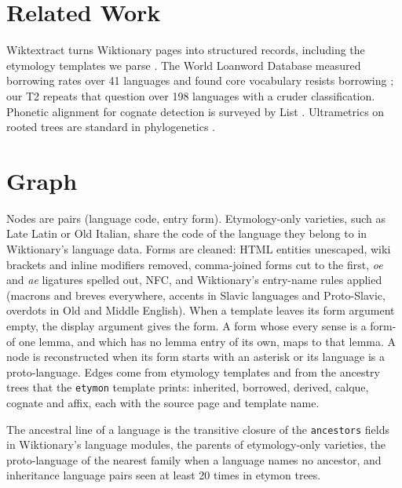 \documentclass[11pt]{article}
\begin{document}
\section{Related Work}
\label{sec:related}

Wiktextract turns Wiktionary pages into structured records, including the
etymology templates we parse \autocite{ylonen2022wiktextract,kaikki2026raw}.
The World Loanword Database measured borrowing rates over 41 languages and
found core vocabulary resists borrowing \autocite{haspelmath2009loanwords};
our T2 repeats that question over 198 languages with a cruder
classification. Phonetic alignment for cognate detection is surveyed by
List \autocite{list2014sequence}. Ultrametrics on rooted trees are
standard in phylogenetics \autocite{semple2003phylogenetics}.

\section{Graph}
\label{sec:graph}

\begin{definition}
\label{def:graph}
Nodes are pairs (language code, entry form). Etymology-only varieties,
such as Late Latin or Old Italian, share the code of the language they
belong to in Wiktionary's language data. Forms are cleaned: HTML entities
unescaped, wiki brackets and inline modifiers removed, comma-joined forms
cut to the first, \emph{oe} and \emph{ae} ligatures spelled out, NFC, and
Wiktionary's entry-name rules applied (macrons and breves everywhere,
accents in Slavic languages and Proto-Slavic, overdots in Old and Middle
English). When a template leaves its form argument empty, the display
argument gives the form. A form whose every sense is a form-of one lemma,
and which has no lemma entry of its own, maps to that lemma. A node is
reconstructed when its form starts with an asterisk or its language is a
proto-language. Edges come from etymology templates and from the ancestry
trees that the \texttt{etymon} template prints: inherited, borrowed,
derived, calque, cognate and affix, each with the source page and
template name.
\end{definition}

\begin{definition}
\label{def:line}
The ancestral line of a language is the transitive closure of the
\texttt{ancestors} fields in Wiktionary's language modules, the parents of
etymology-only varieties, the proto-language of the nearest family when a
language names no ancestor, and inheritance language pairs seen at least
20 times in etymon trees.
\end{definition}
\end{document}
